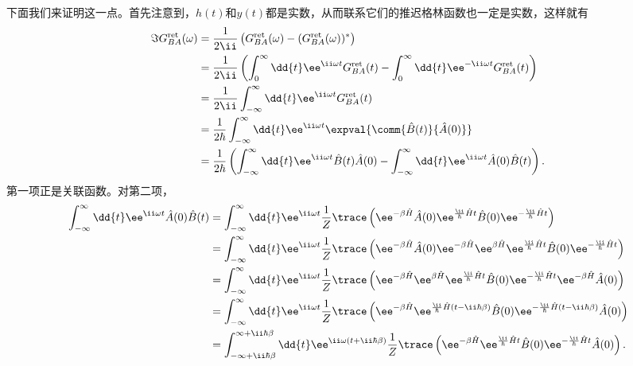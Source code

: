 下面我们来证明这一点。首先注意到，$h(t)$和$y(t)$都是实数，从而联系它们的推迟格林函数也一定是实数，这样就有
\[
    \begin{aligned}
        \Im G_{BA}^\text{ret}(\omega) &= \frac{1}{2\ii} \left( G_{BA}^\text{ret}(\omega) -( G_{BA}^\text{ret}(\omega))^* \right) \\
        &= \frac{1}{2\ii} \left( \int_0^\infty \dd{t} \ee^{\ii \omega t} G_{BA}^\text{ret}(t) -\int_0^\infty \dd{t} \ee^{- \ii \omega t} G_{BA}^\text{ret}(t) \right) \\
        &= \frac{1}{2\ii} \int_{-\infty}^\infty \dd{t} \ee^{\ii \omega t} G_{BA}^\text{ret}(t) \\
        &= \frac{1}{2\hbar} \int_{-\infty}^\infty \dd{t} \ee^{\ii \omega t} \expval{\comm{\hat{B}(t)}{\hat{A}(0)}} \\
        &= \frac{1}{2\hbar} \left( \int_{-\infty}^\infty \dd{t} \ee^{\ii \omega t} \hat{B}(t) \hat{A}(0) - \int_{-\infty}^\infty \dd{t} \ee^{\ii \omega t} \hat{A}(0) \hat{B}(t) \right).
    \end{aligned}
\]
第一项正是关联函数。对第二项，
\[
    \begin{aligned}
        \int_{-\infty}^\infty \dd{t} \ee^{\ii \omega t} \hat{A}(0) \hat{B}(t) &= \int_{-\infty}^\infty \dd{t} \ee^{\ii \omega t} \frac{1}{Z} \trace \left( \ee^{-\beta \hat{H}} \hat{A}(0) \ee^{\frac{\ii}{\hbar} \hat{H} t} \hat{B}(0) \ee^{ - \frac{\ii}{\hbar} \hat{H} t} \right) \\
        &= \int_{-\infty}^\infty \dd{t} \ee^{\ii \omega t} \frac{1}{Z} \trace \left( \ee^{-\beta\hat{H}} \hat{A}(0) \ee^{-\beta \hat{H}} \ee^{\beta \hat{H}} \ee^{\frac{\ii}{\hbar} \hat{H} t} \hat{B}(0) \ee^{ - \frac{\ii}{\hbar} \hat{H} t} \right) \\
        &= \int_{-\infty}^\infty \dd{t} \ee^{\ii \omega t} \frac{1}{Z} \trace \left( \ee^{-\beta \hat{H}} \ee^{\beta \hat{H}} \ee^{\frac{\ii}{\hbar} \hat{H} t} \hat{B}(0) \ee^{ - \frac{\ii}{\hbar} \hat{H} t} \ee^{-\beta\hat{H}} \hat{A}(0) \right) \\
        &= \int_{-\infty}^\infty \dd{t} \ee^{\ii \omega t} \frac{1}{Z} \trace \left( \ee^{-\beta \hat{H}} \ee^{\frac{\ii}{\hbar} \hat{H} (t - \ii \hbar \beta)} \hat{B}(0) \ee^{ - \frac{\ii}{\hbar} \hat{H} (t - \ii \hbar \beta)} \hat{A}(0) \right) \\
        &= \int_{-\infty+\ii\hbar\beta}^{\infty+\ii\hbar\beta} \dd{t} \ee^{\ii \omega (t + \ii \hbar \beta)} \frac{1}{Z} \trace \left( \ee^{-\beta \hat{H}} \ee^{\frac{\ii}{\hbar} \hat{H} t} \hat{B}(0) \ee^{ - \frac{\ii}{\hbar} \hat{H} t} \hat{A}(0) \right).
    \end{aligned}
\]
